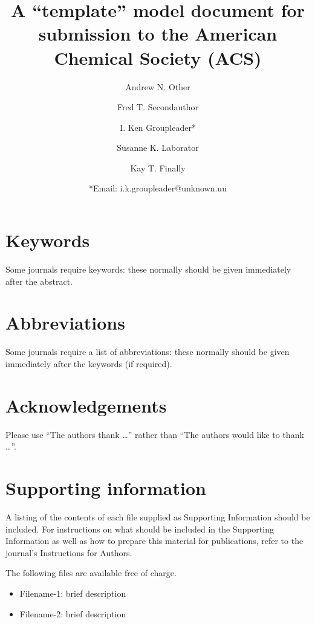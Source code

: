 \documentclass[letterpaper]{article}
\author[1]{Andrew N. Other}
\author[1]{Fred T. Secondauthor}
\author[1]{I. Ken Groupleader*}
\affil[1]{Department of Chemistry, Unknown University, Unknown Town}
\author[2]{Susanne K. Laborator}
\affil[2]{Lead Discovery, BigPharma, Big Town, USA}
\author[1]{Kay T. Finally}
\title{A ``template'' model document for submission to the
  American Chemical Society (ACS)}
\date{*Email: i.k.groupleader@unknown.uu}
\begin{document}
\maketitle

\begin{abstract}
  
\end{abstract}

\section*{Keywords}

Some journals require keywords: these normally should be given immediately
after the abstract.

\section*{Abbreviations}

Some journals require a list of abbreviations: these normally should be given
immediately after the keywords (if required).






\section*{Acknowledgements}

Please use ``The authors thank \ldots'' rather than ``The authors would like to
thank \ldots''.

\section*{Supporting information}

A listing of the contents of each file supplied as Supporting Information
should be included. For instructions on what should be included in the
Supporting Information as well as how to prepare this material for
publications, refer to the journal's Instructions for Authors.

The following files are available free of charge.
\begin{itemize}
  \item Filename-1: brief description
  \item Filename-2: brief description
\end{itemize}
\end{document}
